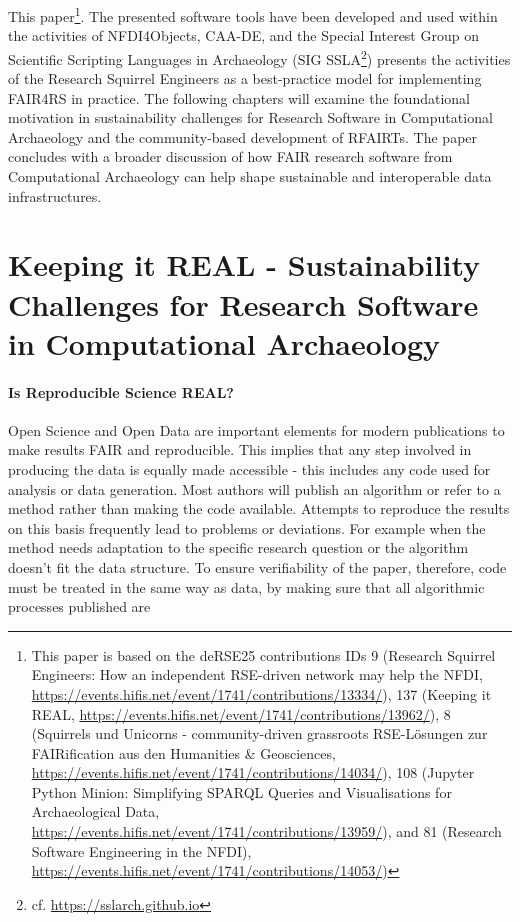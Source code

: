 \documentclass{eceasst}
\begin{document}
This paper\footnote{This paper is based on the deRSE25 contributions IDs 9 (Research Squirrel Engineers: How an independent RSE-driven network may help the NFDI, \url{https://events.hifis.net/event/1741/contributions/13334/}), 137 (Keeping it REAL, \url{https://events.hifis.net/event/1741/contributions/13962/}), 8 (Squirrels und Unicorns - community-driven grassroots RSE-Lösungen zur FAIRification aus den Humanities \& Geosciences, \url{https://events.hifis.net/event/1741/contributions/14034/}), 108 (Jupyter Python Minion: Simplifying SPARQL Queries and Visualisations for Archaeological Data, \url{https://events.hifis.net/event/1741/contributions/13959/}), and 81 (Research Software Engineering in the NFDI), \url{https://events.hifis.net/event/1741/contributions/14053/})}. The presented software tools have been developed and used within the activities of NFDI4Objects, CAA-DE, and the Special Interest Group on Scientific Scripting Languages in Archaeology (SIG SSLA\footnote{cf. \url{https://sslarch.github.io}}) presents the activities of the Research Squirrel Engineers as a best-practice model for implementing FAIR4RS in practice. The following chapters will examine the foundational motivation in sustainability challenges for Research Software in Computational Archaeology and the community-based development of RFAIRTs. The paper concludes with a broader discussion of how FAIR research software from Computational Archaeology can help shape sustainable and interoperable data infrastructures.

\section{Keeping it REAL - Sustainability Challenges for Research Software in Computational Archaeology}
\label{sec:REAL}

\paragraph{Is Reproducible Science REAL?} Open Science and Open Data are important elements for modern publications to make results FAIR and reproducible. This implies that any step involved in producing the data is equally made accessible - this includes any code used for analysis or data generation. Most authors will publish an algorithm or refer to a method rather than making the code available. Attempts to reproduce the results on this basis frequently lead to problems or deviations. For example when the method needs adaptation to the specific research question or the algorithm doesn't fit the data structure. To ensure verifiability of the paper, therefore, code must be treated in the same way as data, by making sure that all algorithmic processes published are
\end{document}
